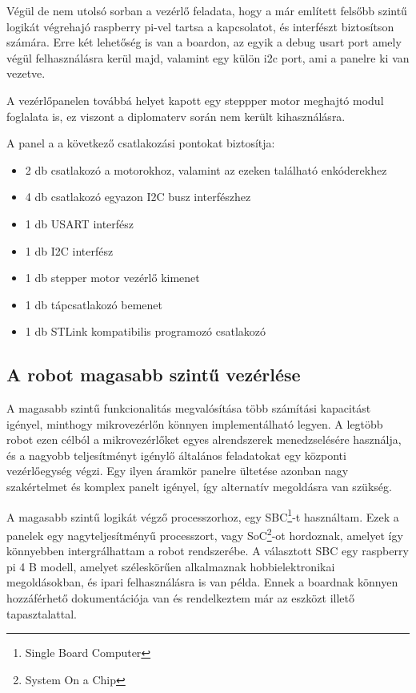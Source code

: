 Végül de nem utolsó sorban a vezérlő feladata, hogy a már említett felsőbb szintű
logikát végrehajó raspberry pi-vel tartsa a kapcsolatot, és interfészt
biztosítson számára. Erre két lehetőség is van a boardon, az egyik a debug usart
port amely végül felhasználásra kerül majd, valamint egy külön i2c port, ami a
panelre ki van vezetve.

A vezérlőpanelen továbbá helyet kapott egy steppper motor meghajtó modul
foglalata is, ez viszont a diplomaterv során nem került kihasználásra.


A panel a a következő csatlakozási pontokat biztosítja:

\begin{itemize}
\item 2 db csatlakozó a motorokhoz, valamint az ezeken található enkóderekhez
\item 4 db csatlakozó egyazon I2C busz interfészhez
\item 1 db USART interfész
\item 1 db I2C interfész
\item 1 db stepper motor vezérlő kimenet
\item 1 db tápcsatlakozó bemenet
\item 1 db STLink kompatibilis programozó csatlakozó
\end{itemize}


\subsection{A robot magasabb szintű vezérlése}
A magasabb szintű funkcionalitás megvalósítása több számítási kapacitást igényel,
minthogy mikrovezérlőn könnyen implementálható legyen. A legtöbb robot ezen
célból a mikrovezérlőket egyes alrendszerek menedzselésére használja, és a
nagyobb teljesítményt igénylő általános feladatokat egy központi vezérlőegység
végzi. Egy ilyen áramkör panelre ültetése azonban nagy szakértelmet és komplex
panelt igényel, így alternatív megoldásra van szükség.

A magasabb szintű logikát végző processzorhoz, egy SBC\footnote{Single Board
Computer}-t használtam. Ezek a panelek egy nagyteljesítményű processzort, vagy
SoC\footnote{System On a Chip}-ot hordoznak, amelyet így könnyebben
intergrálhattam a robot rendszerébe. A választott SBC egy raspberry pi 4 B
modell, amelyet széleskörűen alkalmaznak hobbielektronikai megoldásokban, és
ipari felhasználásra is van példa. Ennek a boardnak könnyen hozzáférhető
dokumentációja van és rendelkeztem már az eszközt illető tapasztalattal.

